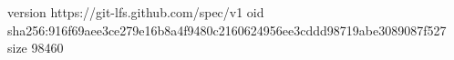 version https://git-lfs.github.com/spec/v1
oid sha256:916f69aee3ce279e16b8a4f9480c2160624956ee3cddd98719abe3089087f527
size 98460
